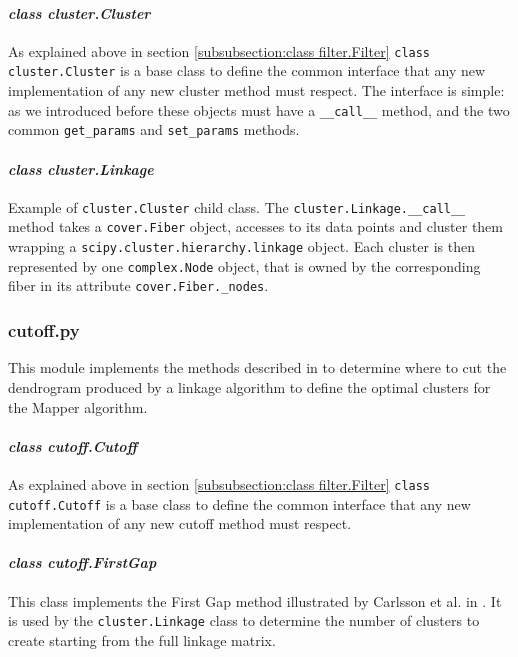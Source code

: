 \paragraph{\textit{class cluster.Cluster}}
As explained above in section \ref{subsubsection:class filter.Filter} \lstinline|class cluster.Cluster| is a base class to define the common interface that any new implementation of any new cluster method must respect. The interface is simple: as we introduced before these objects must have a \lstinline|__call__| method, and the two common \lstinline|get_params| and \lstinline|set_params| methods.
\paragraph{\textit{class cluster.Linkage}}
Example of \lstinline|cluster.Cluster| child class. The \lstinline|cluster.Linkage.__call__| method takes a \lstinline|cover.Fiber| object, accesses to its data points and cluster them wrapping a \lstinline|scipy.cluster.hierarchy.linkage| object. Each cluster is then represented by one \lstinline|complex.Node| object, that is owned by the corresponding fiber in its attribute \lstinline|cover.Fiber._nodes|.

\subsubsection{cutoff.py}
This module implements the methods described in \cite{PAD} to determine where to cut the dendrogram produced by a linkage algorithm to define the optimal clusters for the Mapper algorithm.
\paragraph{\textit{class cutoff.Cutoff}}
As explained above in section \ref{subsubsection:class filter.Filter} \lstinline|class cutoff.Cutoff| is a base class to define the common interface that any new implementation of any new cutoff method must respect.
\paragraph{\textit{class cutoff.FirstGap}}
This class implements the First Gap method illustrated by Carlsson et al. in \cite{PAD}. It is used by the  \lstinline|cluster.Linkage| class to determine the number of clusters to create starting from the full linkage matrix.


